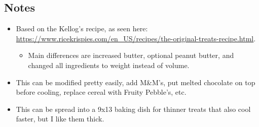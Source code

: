 \begin{multicols}{2}
\subsection*{Notes}
\begin{itemize}
    \item Based on the Kellog's recipe, as seen here: \url{https://www.ricekrispies.com/en_US/recipes/the-original-treats-recipe.html}.
    \begin{itemize}
        \item Main differences are increased butter, optional peanut butter, and changed all ingredients to weight instead of volume.
    \end{itemize}
    \item This can be modified pretty easily, add M\&M's, put melted chocolate on top before cooling, replace cereal with Fruity Pebble's, etc.
    \item This can be spread into a 9x13 baking dish for thinner treats that also cool faster, but I like them thick.
\end{itemize}
\end{multicols}
\clearpage